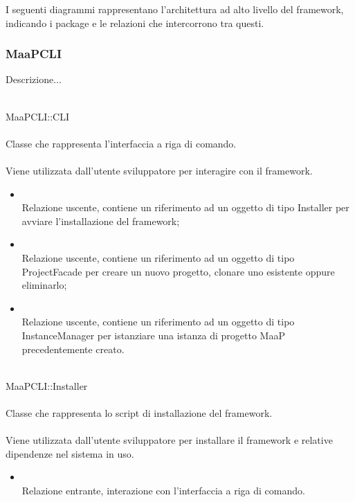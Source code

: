 I seguenti diagrammi rappresentano l'architettura ad alto livello del framework, indicando i package e le relazioni che intercorrono tra questi.

\subsubsection{MaaPCLI}
Descrizione...

	\\
	MaaPCLI::CLI\\
	\\
	Classe che rappresenta l'interfaccia a riga di comando.\\
	\\
	Viene utilizzata dall'utente sviluppatore per interagire con il framework.\\
	\begin{itemize}
	\item{}\\
	Relazione uscente, contiene un riferimento ad un oggetto di tipo Installer per avviare l'installazione del framework;
	\item{}\\
	Relazione uscente, contiene un riferimento ad un oggetto di tipo ProjectFacade per creare un nuovo progetto, clonare uno esistente oppure eliminarlo;
	\item{}\\
	Relazione uscente, contiene un riferimento ad un oggetto di tipo InstanceManager per istanziare una istanza di progetto MaaP precedentemente creato.
	\end{itemize}
	
	\\
	MaaPCLI::Installer\\
	\\
	Classe che rappresenta lo script di installazione del framework.\\
	\\
	Viene utilizzata dall'utente sviluppatore per installare il framework e relative dipendenze nel sistema in uso.\\
	\begin{itemize}
	\item{}\\
	Relazione entrante, interazione con l'interfaccia a riga di comando.
	\end{itemize}
	
